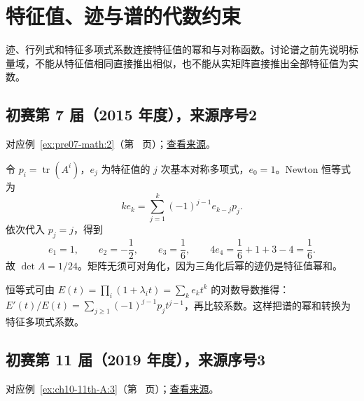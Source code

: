 \documentclass[12pt,fontset=fandol]{ctexart}
\begin{document}
\section{特征值、迹与谱的代数约束}

\label{sec:solutions-3}

迹、行列式和特征多项式系数连接特征值的幂和与对称函数。讨论谱之前先说明标量域，不能从特征值相同直接推出相似，也不能从实矩阵直接推出全部特征值为实数。

\subsection{初赛第 7 届（2015 年度），来源序号2}\label{ans:pre07-math:2}\label{pr:pre07-math:2}

对应例~\ref{ex:pre07-math:2}（第~\pageref{ex:pre07-math:2} 页）；\href{https://github.com/lzxcr/cmc-mathematics/blob/64916fa1fdbc3e444a652eca204d5669058ee321/src/problems/preliminary/07/02.md}{查看来源}。

\begin{solve}

令 $p_i=\operatorname{tr}(A^i)$，$e_j$ 为特征值的 $j$ 次基本对称多项式，$e_0=1$。Newton 恒等式为
\[
ke_k=\sum_{j=1}^k(-1)^{j-1}e_{k-j}p_j.
\]
依次代入 $p_j=j$，得到
\[
e_1=1,\qquad e_2=-\frac12,\qquad e_3=\frac16,
\qquad 4e_4=\frac16+1+3-4=\frac16.
\]
故 $\boxed{\det A=1/24}$。矩阵无须可对角化，因为三角化后幂的迹仍是特征值幂和。

\end{solve}

\begin{remark}[方法与条件]

恒等式可由 $E(t)=\prod_i(1+\lambda_it)=\sum_ke_kt^k$ 的对数导数推得：$E'(t)/E(t)=\sum_{j\ge1}(-1)^{j-1}p_jt^{j-1}$，再比较系数。这样把谱的幂和转换为特征多项式系数。

\end{remark}

\subsection{初赛第 11 届（2019 年度），来源序号3}\label{ans:ch10-11th-A:3}\label{pr:ch10-11th-A:3}

对应例~\ref{ex:ch10-11th-A:3}（第~\pageref{ex:ch10-11th-A:3} 页）；\href{https://github.com/lzxcr/cmc-mathematics/blob/64916fa1fdbc3e444a652eca204d5669058ee321/src/problems/preliminary/11/03.md}{查看来源}。
\end{document}
